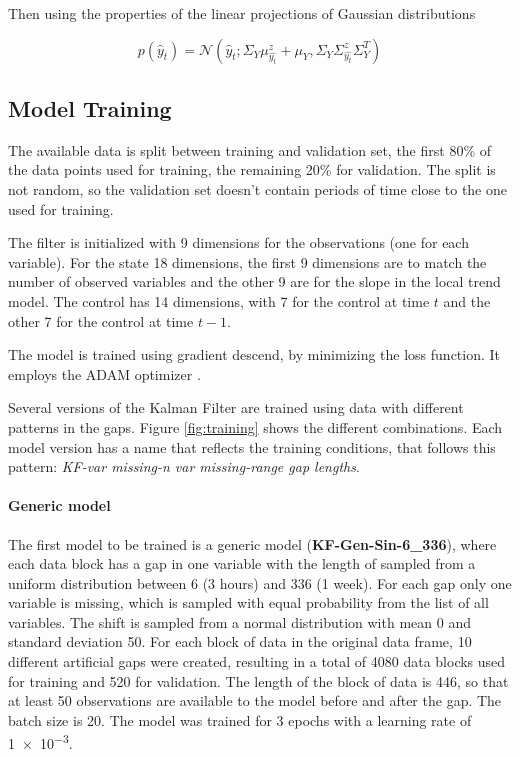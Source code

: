 \documentclass{article}
\newcommand{\norm}[3]{\mathcal{N}\left(#1; #2, #3\right)} %
\let\Oldsubsection\subsection
\renewcommand{\subsection}{\FloatBarrier\Oldsubsection}
\begin{document}
Then using the properties of the linear projections of Gaussian distributions

\begin{equation}
    p(\hat{y}_t) = \norm{\hat{y}_t}{\Sigma_Y\mu^z_{\hat{y_t}} + \mu_Y}{\Sigma_Y\Sigma^z_{\hat{y_t}}\Sigma_Y^T}
\end{equation}

\subsection{Model Training}

The available data is split between training and validation set, the first 80\% of the data points used for training, the remaining 20\% for validation. The split is not random, so the validation set doesn't contain periods of time close to the one used for training.

The filter is initialized with 9 dimensions for the observations (one for each variable). For the state 18 dimensions, the first 9 dimensions are to match the number of observed variables and the other 9 are for the slope in the local trend model. The control has 14 dimensions, with 7 for the control at time $t$ and the other 7 for the control at time $t-1$.

The model is trained using gradient descend, by minimizing the loss function. It employs the ADAM optimizer \cite{kingma_adam_2017}.

Several versions of the Kalman Filter are trained using data with different patterns in the gaps. Figure \ref{fig:training} shows the different combinations. Each model version has a name that reflects the training conditions, that follows this pattern: \textit{KF-\textlangle var missing\textrangle-\textlangle n var missing\textrangle-\textlangle range gap lengths}.

\paragraph{Generic model} The first model to be trained is a generic model (\textbf{KF-Gen-Sin-6\_336}), where each data block has a gap in one variable with the length of sampled from a uniform distribution between \num{6} (3 hours) and \num{336} (1 week). For each gap only one variable is missing, which is sampled with equal probability from the list of all variables. The shift is sampled from a normal distribution with mean 0 and standard deviation 50. For each block of data in the original data frame, 10 different artificial gaps were created, resulting in a total of 4080 data blocks used for training and 520 for validation. 
The length of the block of data is \num{446}, so that at least \num{50} observations are available to the model before and after the gap. The batch size is \num{20}.
The model was trained for \num{3} epochs with a learning rate of \num{1e-3}.
\end{document}
